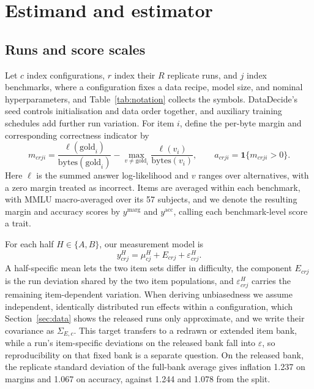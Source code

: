 \section{Estimand and estimator}
\label{sec:estimator}
\subsection{Runs and score scales}
Let $c$ index configurations, $r$ index their $R$ replicate runs, and $j$ index benchmarks, where a configuration fixes a data recipe, model size, and nominal hyperparameters, and Table~\ref{tab:notation} collects the symbols. DataDecide's seed controls initialisation and data order together, and auxiliary training schedules add further run variation. For item $i$, define the per-byte margin and corresponding correctness indicator by
\begin{equation}
m_{crji}=\frac{\ell(\mathrm{gold}_i)}{\mathrm{bytes}(\mathrm{gold}_i)}-
\max_{v\ne\mathrm{gold}_i}\frac{\ell(v_i)}{\mathrm{bytes}(v_i)},
\qquad a_{crji}=\mathbf{1}\{m_{crji}>0\}.
\label{eq:scores}
\end{equation}
Here $\ell$ is the summed answer log-likelihood and $v$ ranges over alternatives, with a zero margin treated as incorrect. Items are averaged within each benchmark, with MMLU macro-averaged over its 57 subjects, and we denote the resulting margin and accuracy scores by $y^{\mathrm{marg}}$ and $y^{\mathrm{acc}}$, calling each benchmark-level score a trait.

For each half $H\in\{A,B\}$, our measurement model is
\begin{equation}
y^H_{crj}=\mu^H_{cj}+E_{crj}+\varepsilon^H_{crj}.
\label{eq:model}
\end{equation}
A half-specific mean lets the two item sets differ in difficulty, the component $E_{crj}$ is the run deviation shared by the two item populations, and $\varepsilon^H_{crj}$ carries the remaining item-dependent variation. When deriving unbiasedness we assume independent, identically distributed run effects within a configuration, which Section~\ref{sec:data} shows the released runs only approximate, and we write their covariance as $\Sigma_{E,c}$. This target transfers to a redrawn or extended item bank, while a run's item-specific deviations on the released bank fall into $\varepsilon$, so reproducibility on that fixed bank is a separate question. On the released bank, the replicate standard deviation of the full-bank average gives inflation 1.237  on margins and 1.067  on accuracy, against 1.244 and 1.078 from the split.

